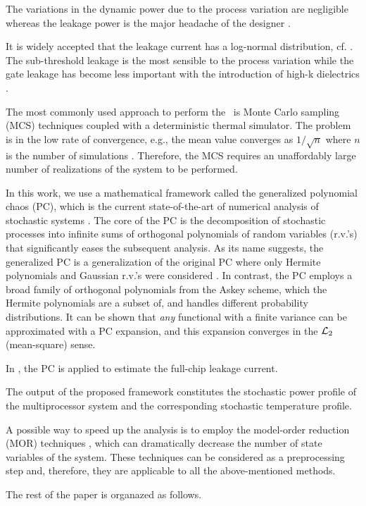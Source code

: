 The variations in the dynamic power due to the process variation are negligible whereas the leakage power is the major headache of the designer \cite{juan2012, srivastava2010}.

It is widely accepted that the leakage current has a log-normal distribution, cf. \cite{juan2012, srivastava2010}. The sub-threshold leakage is the most sensible to the process variation while the gate leakage has become less important with the introduction of high-k dielectrics \cite{juan2012}.

The most commonly used approach to perform the \sta\ is Monte Carlo sampling (MCS) techniques coupled with a deterministic thermal simulator. The problem is in the low rate of convergence, e.g., the mean value converges as $1/\sqrt{n}$ where $n$ is the number of simulations \cite{xiu2009}. Therefore, the MCS requires an unaffordably large number of realizations of the system to be performed.

In this work, we use a mathematical framework called the generalized polynomial chaos (PC), which is the current state-of-the-art of numerical analysis of stochastic systems \cite{xiu2009, xiu2002}. The core of the PC is the decomposition of stochastic processes into infinite sums of orthogonal polynomials of random variables (r.v.'s) that significantly eases the subsequent analysis. As its name suggests, the generalized PC is a generalization of the original PC where only Hermite polynomials and Gaussian r.v.'s were considered \cite{ghanem1991}. In contrast, the PC employs a broad family of orthogonal polynomials from the Askey scheme, which the Hermite polynomials are a subset of, and handles different probability distributions. It can be shown that \emph{any} functional with a finite variance can be approximated with a PC expansion, and this expansion converges in the $\mathcal{L}_{2}$ (mean-square) sense.

In \cite{shen2009}, the PC is applied to estimate the full-chip leakage current.

The output of the proposed framework constitutes the stochastic power profile of the multiprocessor system and the corresponding stochastic temperature profile.

A possible way to speed up the analysis is to employ the model-order reduction (MOR) techniques \cite{benner2011}, which can dramatically decrease the number of state variables of the system. These techniques can be considered as a preprocessing step and, therefore, they are applicable to all the above-mentioned methods.

The rest of the paper is organazed as follows.
